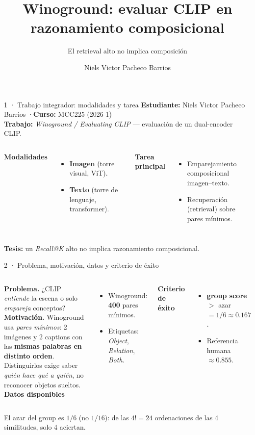 \documentclass[aspectratio=169]{beamer}
\title{Winoground: evaluar CLIP en razonamiento composicional}
\subtitle{El retrieval alto no implica composición}
\author{Niels Victor Pacheco Barrios}
\institute{Maestría en Ciencias de la Computación · MCC225 — IA Generativa y Multimodal · 2026-1\\
Segunda Exposición Académica — Trabajo integrador}
\date{}
\begin{document}
\maketitle

\begin{frame}{1 · Trabajo integrador: modalidades y tarea}
  \textbf{Estudiante:} Niels Victor Pacheco Barrios \quad·\quad \textbf{Curso:} MCC225 (2026-1)\\[2pt]
  \textbf{Trabajo:} \emph{Winoground / Evaluating CLIP} — evaluación de un dual-encoder CLIP.
  \vfill
  \begin{columns}[T]
    \textbf{Modalidades}
    \begin{itemize}
      \item \textbf{Imagen} (torre visual, ViT).
      \item \textbf{Texto} (torre de lenguaje, transformer).
    \end{itemize}
    \textbf{Tarea principal}
    \begin{itemize}
      \item Emparejamiento composicional imagen–texto.
      \item Recuperación (retrieval) sobre pares mínimos.
    \end{itemize}
  \end{columns}
  \vfill
  \centering\footnotesize\textbf{Tesis:} un \emph{Recall@K} alto \alert{no} implica razonamiento composicional.
\end{frame}

\begin{frame}{2 · Problema, motivación, datos y criterio de éxito}
  \begin{columns}[T]
    \textbf{Problema.} ¿CLIP \emph{entiende} la escena o solo \emph{empareja} conceptos?\\[4pt]
    \textbf{Motivación.} Winoground usa \emph{pares mínimos}: 2 imágenes y 2 captions con las
    \textbf{mismas palabras en distinto orden}. Distinguirlos exige saber \emph{quién hace qué a quién},
    no reconocer objetos sueltos.
    \textbf{Datos disponibles}
    \begin{itemize}
      \item Winoground: \textbf{400} pares mínimos.
      \item Etiquetas: \emph{Object}, \emph{Relation}, \emph{Both}.
    \end{itemize}
    \textbf{Criterio de éxito}
    \begin{itemize}
      \item \textbf{group score} $>$ azar $= 1/6 \approx \mathbf{0.167}$.
      \item Referencia humana $\approx 0.855$.
    \end{itemize}
  \end{columns}
  \vfill
  \centering\footnotesize El azar del group es $1/6$ (no $1/16$): de las $4!=24$ ordenaciones de las 4 similitudes, solo 4 aciertan.
\end{frame}
\end{document}
